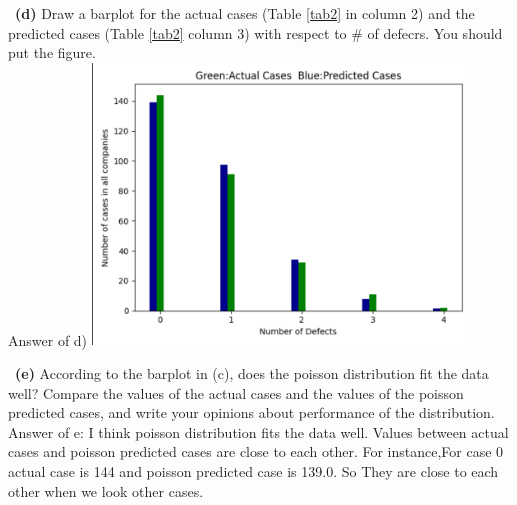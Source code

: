 \documentclass[a4 paper]{article}
\numberwithin{equation}{section}
\newcommand{\subproblem}[1]{~\newline\textbf{(#1)}}
\newcommand{\0}{\mathbf{0}}
\begin{document}
	\subproblem{d} Draw a barplot for the actual cases (Table \ref{tab2} in column 2) and the predicted cases (Table \ref{tab2} column 3) with respect to \# of defecrs. You should put the figure.\\
	
    Answer of d)
	\includegraphics[width=10cm]{Output.png}
	
	\subproblem{e} According to the barplot in (c), does the poisson distribution fit the data well? Compare the values of the actual cases and the values of the poisson predicted cases, and write your opinions about performance of the distribution.\\
	\newline
	Answer of e:
	\newline
	I think poisson distribution fits the data well. Values between actual cases and poisson predicted cases are close to each other. For instance,For case 0 actual case is 144 and poisson predicted case is 139.0. So They are close to each other when we look other cases.
	
\end{document}

